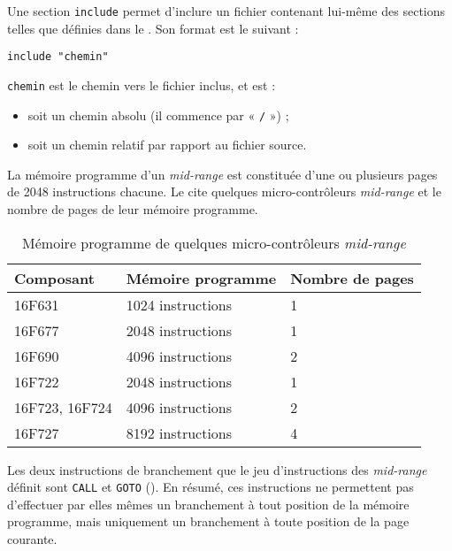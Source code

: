 
Une section \texttt{include} permet d'inclure un fichier contenant lui-même des sections telles que définies dans le .  Son format est le suivant :

\begin{lstlisting}[language=piccolo]
  include "chemin"
\end{lstlisting}

\texttt{chemin} est le chemin vers le fichier inclus, et est :
\begin{itemize}
  \item soit un chemin absolu (il commence par « \texttt{/} ») ;
  \item soit un chemin relatif par rapport au fichier source.
\end{itemize}


La mémoire programme d'un \emph{mid-range} est constituée d'une ou plusieurs pages de 2048 instructions chacune. Le  cite quelques micro-contrôleurs \emph{mid-range} et le nombre de pages de leur mémoire programme.

\begin{table}[!ht]
  \centering
  \small
  \begin{tabular}{lll}
    \textbf{Composant} & \textbf{Mémoire programme} & \textbf{Nombre de pages}\\
    \hline
    16F631  & 1024 instructions & 1\\
    16F677  & 2048 instructions & 1\\
    16F690  & 4096 instructions & 2\\
    16F722  & 2048 instructions & 1\\
    16F723, 16F724  & 4096 instructions & 2\\
    16F727  & 8192 instructions & 4\\
    \hline
  \end{tabular}
  \caption{Mémoire programme de quelques micro-contrôleurs \emph{mid-range}}
\end{table}

Les deux instructions de branchement que le jeu d'instructions des \emph{mid-range} définit sont \texttt{CALL} et \texttt{GOTO} (). En résumé, ces instructions ne permettent pas d'effectuer par elles mêmes un branchement à tout position de la mémoire programme, mais uniquement un branchement à toute position de la page courante.

